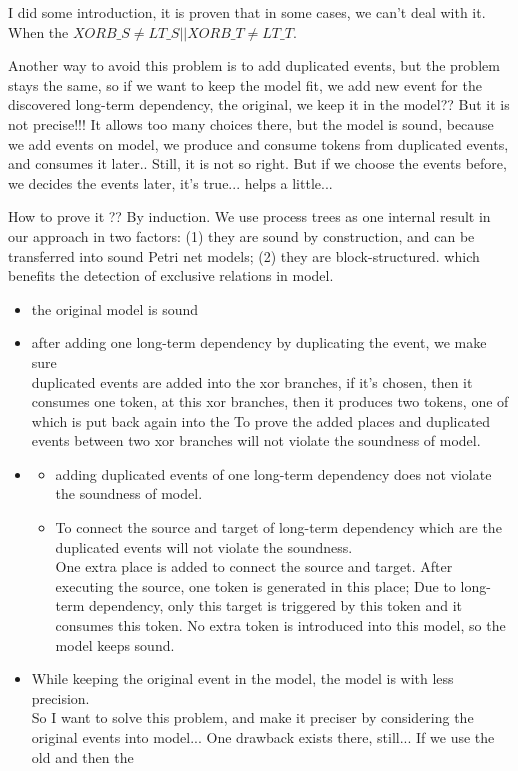 \documentclass[]{article}
\begin{document}
I did some introduction, it is proven that in some cases, we can't deal with it. When the $XORB\_S \neq LT\_S || XORB\_T \neq LT\_T$.

Another way to avoid this problem is to add duplicated events, but the problem stays the same, so if we want to keep the model fit, we add new event for the discovered long-term dependency, the original, we keep it in the model?? But it is not precise!!! It allows too many choices there, but the model is sound, because we add events on model, we produce and consume tokens from duplicated events, and consumes it later.. Still, it is not so right. But if we choose the events before, we decides the events later, it's true... helps a little... 

How to prove it ?? By induction. 
We use  process  trees as one internal result in  our  approach in two factors: (1) they are sound by construction, and can be transferred into sound Petri net models; (2) they are block-structured. which benefits the detection of exclusive relations in model.

\begin{itemize}
	\item the original model is sound
	\item after adding one long-term dependency by duplicating the event, we make sure
	 \\ duplicated events are added into the xor branches, if it's chosen, then it consumes one token, at this xor branches, then it produces two tokens, one of which is put back again into the 
	 To prove the added places and duplicated events between two xor branches will not violate the soundness of model. 
	 \item 
	 \begin{itemize}
	 	\item adding duplicated events of one long-term dependency does not violate the soundness of model. 
	 	
	 	\item To connect the source and target  of long-term dependency which are the duplicated events will not violate the soundness.
	 	\\ One extra place is added to connect the source and target. After executing the source, one token is generated in this place; Due to long-term dependency, only this target is triggered by this token and it consumes this token. No extra token is introduced into this model, so the model keeps sound. 
	 	
	 \end{itemize}
	 
	 \item While keeping the original event in the model,  the model is with less precision.  
	 \\ 
	 So I want to solve this problem, and make it preciser by considering the original events into model... 
	 One drawback exists there, still... If we use the old and then the 
\end{itemize}
\end{document}
